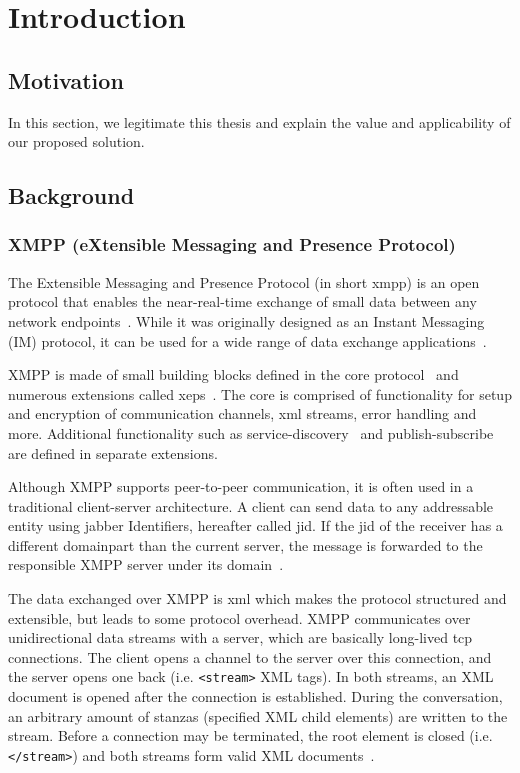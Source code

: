 \newcommand{\code}{\texttt}
\chapter{Introduction}
\label{sec:introduction}

\section{Motivation}
In this section, we legitimate this thesis and explain the value and applicability of our proposed solution.

\section{Background}

\subsection{XMPP (eXtensible Messaging and Presence Protocol)}
The Extensible Messaging and Presence Protocol (in short \gls{xmpp}) is an open protocol that enables the near-real-time exchange of small data between any network endpoints~\cite{rfc6120}.
While it was originally designed as an Instant Messaging (IM) protocol, it can be used for a wide range of data exchange applications~\cite{ieee-xplore-stream-xml-xmpp}.

XMPP is made of small building blocks defined in the core protocol~\cite{rfc6120} and numerous extensions called \glspl{xep}~\cite{xep-0001}.
The core is comprised of functionality for setup and encryption of communication channels, \gls{xml} streams, error handling and more. Additional functionality such as \gls{service-discovery}~\cite{xep-0030} and \gls{publish-subscribe}~\cite{xep-0060} are defined in separate extensions.

Although XMPP supports peer-to-peer communication, it is often used in a traditional client-server architecture.
A client can send data to any addressable entity using \Gls{jabber} Identifiers, hereafter called \gls{jid}. If the \gls{jid} of the receiver has a different domainpart than the current server, the message is forwarded to the responsible XMPP server under its domain~\cite{rfc6120}.

The data exchanged over XMPP is \gls{xml} which makes the protocol structured and extensible, but leads to some protocol overhead.
XMPP communicates over unidirectional data streams with a server, which are basically long-lived \gls{tcp} connections.
The client opens a channel to the server over this connection, and the server opens one back (i.e. \code{<stream>} XML tags). In both streams, an XML document is opened after the connection is established.
During the conversation, an arbitrary amount of \glspl{stanza} (specified XML child elements) are written to the stream.
Before a connection may be terminated, the root element is closed (i.e. \code{</stream>}) and both streams form valid XML documents~\cite{rfc6120}\cite{professional-xmpp}.

